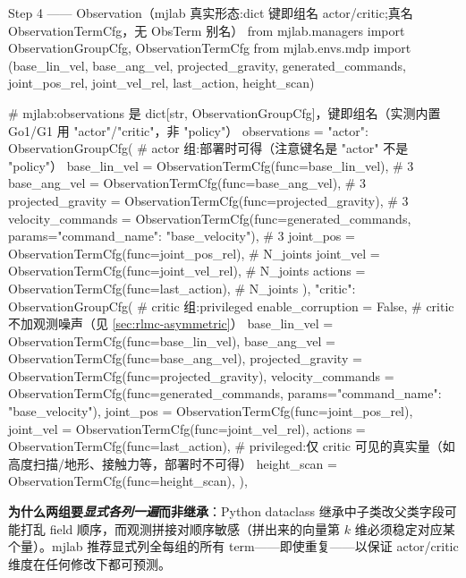 \begin{codebox}[Python]{Step 4 —— Observation（mjlab 真实形态:dict 键即组名 actor/critic;真名 ObservationTermCfg，无 ObsTerm 别名）}
from mjlab.managers import ObservationGroupCfg, ObservationTermCfg
from mjlab.envs.mdp import (base_lin_vel, base_ang_vel, projected_gravity,
                            generated_commands, joint_pos_rel, joint_vel_rel,
                            last_action, height_scan)

# mjlab:observations 是 dict[str, ObservationGroupCfg]，键即组名（实测内置 Go1/G1 用 "actor"/"critic"，非 "policy"）
observations = {
    "actor": ObservationGroupCfg(                # actor 组:部署时可得（注意键名是 "actor" 不是 "policy"）
        base_lin_vel      = ObservationTermCfg(func=base_lin_vel),       # 3
        base_ang_vel      = ObservationTermCfg(func=base_ang_vel),       # 3
        projected_gravity = ObservationTermCfg(func=projected_gravity),  # 3
        velocity_commands = ObservationTermCfg(func=generated_commands,
                                    params={"command_name": "base_velocity"}),  # 3
        joint_pos = ObservationTermCfg(func=joint_pos_rel),             # N_joints
        joint_vel = ObservationTermCfg(func=joint_vel_rel),             # N_joints
        actions   = ObservationTermCfg(func=last_action),               # N_joints
    ),
    "critic": ObservationGroupCfg(               # critic 组:privileged
        enable_corruption = False,               # critic 不加观测噪声（见 \cref{sec:rlmc-asymmetric}）
        base_lin_vel      = ObservationTermCfg(func=base_lin_vel),
        base_ang_vel      = ObservationTermCfg(func=base_ang_vel),
        projected_gravity = ObservationTermCfg(func=projected_gravity),
        velocity_commands = ObservationTermCfg(func=generated_commands,
                                    params={"command_name": "base_velocity"}),
        joint_pos = ObservationTermCfg(func=joint_pos_rel),
        joint_vel = ObservationTermCfg(func=joint_vel_rel),
        actions   = ObservationTermCfg(func=last_action),
        # privileged:仅 critic 可见的真实量（如高度扫描/地形、接触力等，部署时不可得）
        height_scan = ObservationTermCfg(func=height_scan),
    ),
}
\end{codebox}

\textbf{为什么两组要\emph{显式各列一遍}而非继承}：Python dataclass 继承中子类改父类字段可能打乱 field 顺序，而观测拼接对顺序敏感（拼出来的向量第 $k$ 维必须稳定对应某个量）。mjlab 推荐显式列全每组的所有 term——即使重复——以保证 actor/critic 维度在任何修改下都可预测。

